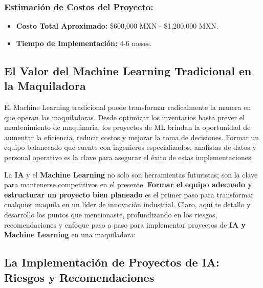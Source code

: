 \documentclass[
  10pt,
  letterpaper,
]{book}
\providecommand{\tightlist}{%
  \setlength{\itemsep}{0pt}\setlength{\parskip}{0pt}}\usepackage{longtable,booktabs,array}
\begin{document}
\subsubsection{\texorpdfstring{\textbf{Estimación de Costos del
Proyecto:}}{Estimación de Costos del Proyecto:}}\label{estimaciuxf3n-de-costos-del-proyecto}

\begin{itemize}
\tightlist
\item
  \textbf{Costo Total Aproximado:} \$600,000 MXN - \$1,200,000 MXN.
\item
  \textbf{Tiempo de Implementación:} 4-6 meses.
\end{itemize}

\subsection{\texorpdfstring{\textbf{El Valor del Machine Learning
Tradicional en la
Maquiladora}}{El Valor del Machine Learning Tradicional en la Maquiladora}}\label{el-valor-del-machine-learning-tradicional-en-la-maquiladora}

El Machine Learning tradicional puede transformar radicalmente la manera
en que operan las maquiladoras. Desde optimizar los inventarios hasta
prever el mantenimiento de maquinaria, los proyectos de ML brindan la
oportunidad de aumentar la eficiencia, reducir costos y mejorar la toma
de decisiones. Formar un equipo balanceado que cuente con ingenieros
especializados, analistas de datos y personal operativo es la clave para
asegurar el éxito de estas implementaciones.

La \textbf{IA} y el \textbf{Machine Learning} no solo son herramientas
futuristas; son la clave para mantenerse competitivos en el presente.
\textbf{Formar el equipo adecuado y estructurar un proyecto bien
planeado} es el primer paso para transformar cualquier maquila en un
líder de innovación industrial. Claro, aquí te detallo y desarrollo los
puntos que mencionaste, profundizando en los riesgos, recomendaciones y
enfoque paso a paso para implementar proyectos de \textbf{IA y Machine
Learning} en una maquiladora:

\subsection{\texorpdfstring{\textbf{La Implementación de Proyectos de
IA: Riesgos y
Recomendaciones}}{La Implementación de Proyectos de IA: Riesgos y Recomendaciones}}\label{la-implementaciuxf3n-de-proyectos-de-ia-riesgos-y-recomendaciones}
\end{document}
